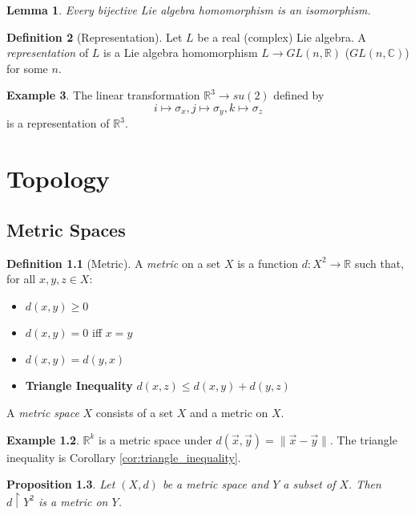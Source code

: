 \documentclass{book}
\newtheorem{prop}{Proposition}[chapter]
\newtheorem{lm}[prop]{Lemma}
\theoremstyle{definition}
\newtheorem{df}[prop]{Definition}
\newtheorem{ex}[prop]{Example}
\begin{document}
\begin{lm}
Every bijective Lie algebra homomorphism is an isomorphism.
\end{lm}


\begin{df}[Representation]
Let $L$ be a real (complex) Lie algebra. A \emph{representation} of $L$ is a Lie algebra homomorphism $L \rightarrow GL(n, \mathbb{R})$ ($GL(n, \mathbb{C})$) for some $n$.
\end{df}

\begin{ex}
The linear transformation $\mathbb{R}^3 \rightarrow su(2)$ defined by
\[ i \mapsto \sigma_x, j \mapsto \sigma_y, k \mapsto \sigma_z \]
is a representation of $\mathbb{R}^3$.
\end{ex}

\part{Topology}

\chapter{Metric Spaces}

\begin{df}[Metric]
A \emph{metric} on a set $X$ is a function $d : X^2 \rightarrow \mathbb{R}$ such that, for all $x,y,z \in X$:
\begin{itemize}
\item $d(x,y) \geq 0$
\item $d(x,y) = 0$ iff $x = y$
\item $d(x,y) = d(y,x)$
\item \textbf{Triangle Inequality} $d(x,z) \leq d(x,y) + d(y,z)$
\end{itemize}

A \emph{metric space} $X$ consists of a set $X$ and a metric on $X$.
\end{df}

\begin{ex}
$\mathbb{R}^k$ is a metric space under $d(\vec{x},\vec{y}) = \| \vec{x} - \vec{y} \|$. The triangle inequality is Corollary \ref{cor:triangle_inequality}.
\end{ex}

\begin{prop}
Let $(X,d)$ be a metric space and $Y$ a subset of $X$. Then $d \restriction Y^2$ is a metric on $Y$.
\end{prop}
\end{document}
